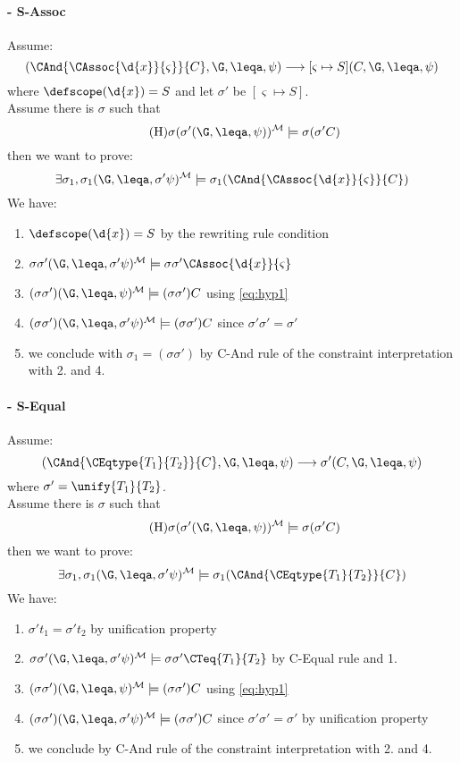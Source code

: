  \paragraph{- \sc S-Assoc}Assume:
$$(\CAnd{\CAssoc{\d{x}}{\varsigma}}{C},\G,\leqa,\psi) \longrightarrow [\varsigma \mapsto S](C,\G,\leqa,\psi) $$
where $\defscope(\d{x}) = S$ and let $\sigma'$ be $[\varsigma \mapsto S]$.\\
Assume there is $\sigma$ such that 
\begin{equation}\tag{H}
  \label{eq:hyp1}
\sigma(\sigma'(\G,\leqa,\psi))\tomod\models \sigma(\sigma'C)
\end{equation}
then we want to prove:
\begin{equation*}
\exists \sigma_1, \sigma_1(\G,\leqa,\sigma'\psi)\tomod\models \sigma_1(\CAnd{\CAssoc{\d{x}}{\varsigma}}{C})
\end{equation*}
We have:  
\begin{enumerate}
 \item $\defscope(\d{x}) = S$ by the rewriting rule condition
 \item $\sigma\sigma'(\G,\leqa,\sigma'\psi)\tomod\models \sigma\sigma'\CAssoc{\d{x}}{\varsigma}$
 \item $ (\sigma\sigma')(\G,\leqa,\psi)\tomod\models (\sigma\sigma')C$ using \ref{eq:hyp1}   
 \item $ (\sigma\sigma')(\G,\leqa,\sigma'\psi)\tomod\models (\sigma\sigma')C$ since $\sigma'\sigma'=\sigma'$
 \item we conclude with $\sigma_1=(\sigma\sigma')$ by {\sc C-And} rule of the constraint interpretation with 2. and 4.
\end{enumerate}
\sepa
 \paragraph{- \sc S-Equal} Assume:
$$(\CAnd{\CEqtype{T_1}{T_2}}{C},\G,\leqa,\psi) \longrightarrow \sigma' (C, \G, \leqa, \psi) $$
where $\sigma' = \unify{T_1}{T_2}$.\\
Assume there is $\sigma$ such that 
\begin{equation}\tag{H}
  \label{eq:hyp1}
\sigma(\sigma'(\G,\leqa,\psi))\tomod\models \sigma(\sigma'C)
\end{equation}
then we want to prove:
\begin{equation*}
\exists \sigma_1, \sigma_1(\G,\leqa,\sigma'\psi)\tomod\models \sigma_1(\CAnd{\CEqtype{T_1}{T_2}}{C})
\end{equation*}
We have:    
\begin{enumerate}
 \item $\sigma' t_1 = \sigma' t_2$ by unification property
 \item $\sigma\sigma'(\G,\leqa,\sigma'\psi)\tomod\models \sigma\sigma'\CTeq{T_1}{T_2}$ by {\sc C-Equal} rule and 1.
 \item $ (\sigma\sigma')(\G,\leqa,\psi)\tomod\models (\sigma\sigma')C$ using \ref{eq:hyp1}   
 \item $ (\sigma\sigma')(\G,\leqa,\sigma'\psi)\tomod\models (\sigma\sigma')C$ since $\sigma'\sigma'=\sigma'$ by unification property
 \item we conclude by {\sc C-And} rule of the constraint interpretation with 2. and 4.
\end{enumerate}
\sepa
